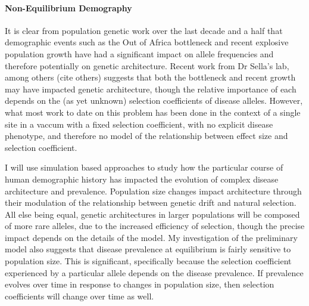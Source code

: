 \documentclass[11pt]{article}
\newcommand{\jb}[1]{{\color{blue} (#1)} }
\begin{document}



\paragraph{Non-Equilibrium Demography}


It is clear from population genetic work over the last decade and a half that demographic events such as the Out of Africa bottleneck and recent explosive population growth have had a significant impact on allele frequencies and therefore potentially on genetic architecture. Recent work from Dr Sella's lab\cite{Simons:2014fj}, among others \jb{cite others} suggests that both the bottleneck and recent growth may have impacted genetic architecture, though the relative importance of each depends on the (as yet unknown) selection coefficients of disease alleles. However, what most work to date on this problem has been done in the context of a single site in a vaccum with a fixed selection coefficient, with no explicit disease phenotype, and therefore no model of the relationship between effect size and selection coefficient.

I will use simulation based approaches to study how the particular course of human demographic history has impacted the evolution of complex disease architecture and prevalence. Population size changes impact architecture through their modulation of the relationship between genetic drift and natural selection. All else being equal, genetic architectures in larger populations will be composed of more rare alleles, due to the increased efficiency of selection, though the precise impact depends on the details of the model. My investigation of the preliminary model also suggests that disease prevalence at equilibrium is fairly sensitive to population size. This is significant, specifically because the selection coefficient experienced by a particular allele depends on the disease prevalence. If prevalence evolves over time in response to changes in population size, then selection coefficients will change over time as well.
\end{document}
